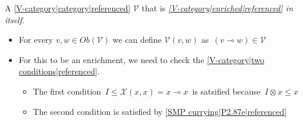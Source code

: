 
A \ref{V-category|category|referenced} $\mathcal{V}$ that is \emph{\ref{V-category|enriched|referenced} in itself}.

\begin{itemize}
    \item  For every $v,w \in Ob(\mathcal{V})$ we can define $\mathcal{V}(v,w)$ as \,$(v \multimap w) \in \mathcal{V}$\,
    \item For this to be an enrichment, we need to check the \ref{V-category|two conditions|referenced}.
          \begin{itemize}
            \item The first condition \,$I \leq \mathcal{X}(x,x) = x \multimap x$\, is satsified because \,$I \otimes x \leq x$\,
            \item The second condition is satisfied by \ref{SMP currying|P2.87e|referenced}

          \end{itemize}
  \end{itemize}
